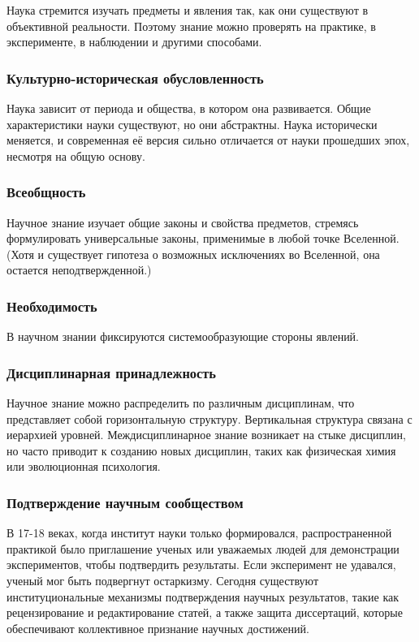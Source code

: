Наука стремится изучать предметы и явления так, как они существуют в объективной
реальности. Поэтому знание можно проверять на практике, в эксперименте, в
наблюдении и другими способами. 

\subsubsection{Культурно-историческая обусловленность}

Наука зависит от периода и общества, в котором она развивается. Общие характеристики науки существуют, но они абстрактны. Наука исторически меняется, и современная её версия сильно отличается от науки прошедших эпох, несмотря на общую основу.

\subsubsection{Всеобщность}

Научное знание изучает общие законы и свойства предметов, стремясь формулировать универсальные законы, применимые в любой точке Вселенной. (Хотя и существует гипотеза о возможных исключениях во Вселенной, она остается неподтвержденной.)

\subsubsection{Необходимость}

В научном знании фиксируются системообразующие стороны явлений. 

\subsubsection{Дисциплинарная принадлежность}

Научное знание можно распределить по различным дисциплинам, что представляет собой горизонтальную структуру. Вертикальная структура связана с иерархией уровней. Междисциплинарное знание возникает на стыке дисциплин, но часто приводит к созданию новых дисциплин, таких как физическая химия или эволюционная психология.

\subsubsection{Подтверждение научным сообществом}

В 17-18 веках, когда институт науки только формировался, распространенной практикой было приглашение ученых или уважаемых людей для демонстрации экспериментов, чтобы подтвердить результаты. Если эксперимент не удавался, ученый мог быть подвергнут остаркизму. Сегодня существуют институциональные механизмы подтверждения научных результатов, такие как рецензирование и редактирование статей, а также защита диссертаций, которые обеспечивают коллективное признание научных достижений.

